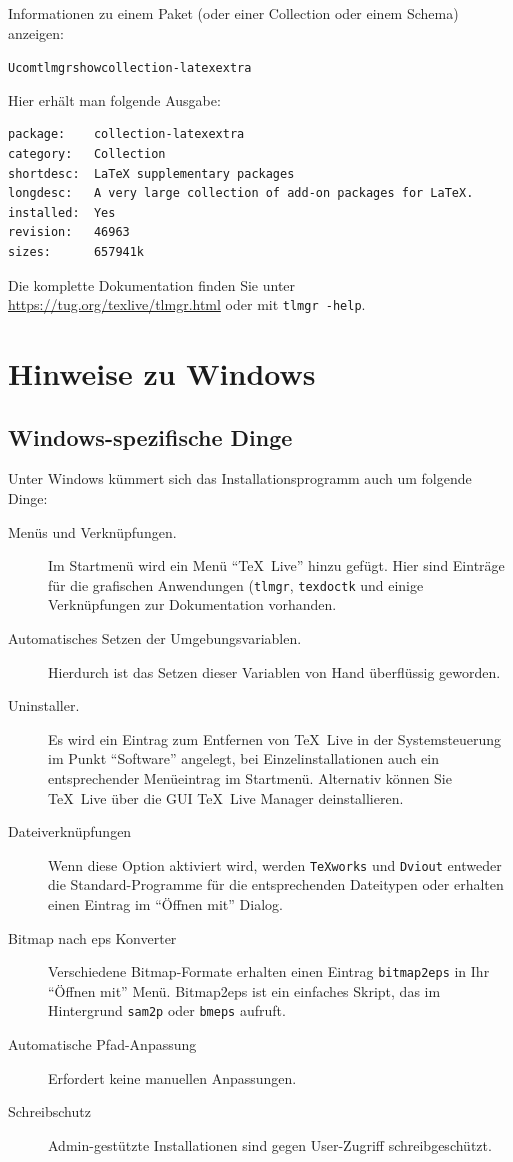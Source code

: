 \documentclass[12pt,ngerman,a4paper,fullparskip]{scrreprt}
\newcommand{\TL}{\TeX\ Live\xspace}
\newcommand{\cmdname}[1]{\texttt{#1}}
\newcommand{\prog}[1]{\texttt{#1}}
\begin{document}
Informationen zu einem Paket (oder einer Collection oder einem Schema) anzeigen:

\begin{alltt}
Ucom{tlmgr show collection-latexextra}
\end{alltt}

Hier erhält man folgende Ausgabe:

\begin{verbatim}
package:    collection-latexextra
category:   Collection
shortdesc:  LaTeX supplementary packages
longdesc:   A very large collection of add-on packages for LaTeX.
installed:  Yes
revision:   46963
sizes:      657941k
\end{verbatim}

\noindent Die komplette Dokumentation finden Sie unter \url{https://tug.org/texlive/tlmgr.html}
oder mit \texttt{tlmgr -help}.

\chapter{Hinweise zu Windows}
\label{sec:windows}


\section{Windows-spezifische Dinge}
\label{sec:winfeatures}

Unter Windows kümmert sich das Installationsprogramm auch um folgende Dinge:

\begin{description}
\item[Menüs und Verknüpfungen.] Im Startmenü wird ein Menü \enquote{\TL} hinzu gefügt. Hier sind Einträge für
  die grafischen Anwendungen (\prog{tlmgr}, \prog{texdoctk} 
  und einige Verknüpfungen zur Dokumentation vorhanden. 
\item[Automatisches Setzen der Umgebungsvariablen.] Hierdurch ist das Setzen dieser Variablen
  von Hand überflüssig geworden.
\item[Uninstaller.] Es wird ein Eintrag zum Entfernen von \TL in der Systemsteuerung im Punkt \enquote{Software} angelegt, bei Einzelinstallationen auch ein entsprechender Menüeintrag im Startmenü.
  Alternativ können Sie \TL über die GUI \TeX\ Live Manager deinstallieren.
\item[Dateiverknüpfungen] Wenn diese Option aktiviert wird, werden \prog{TeXworks} und \prog{Dviout}
  entweder die Standard-Programme für die entsprechenden Dateitypen oder erhalten einen Eintrag im \enquote{Öffnen mit} Dialog. \enlargethispage{1.5cm}
\item[Bitmap nach eps Konverter] Verschiedene Bitmap-Formate erhalten einen Eintrag \cmdname{bitmap2eps} in Ihr \enquote{Öffnen mit} Menü. Bitmap2eps ist ein einfaches Skript, das im Hintergrund \cmdname{sam2p} oder \cmdname{bmeps} aufruft. 
\item[Automatische Pfad-Anpassung] Erfordert keine manuellen Anpassungen.
\item[Schreibschutz] Admin-gestützte Installationen sind gegen User-Zugriff schreibgeschützt. 
\end{description}
\end{document}

